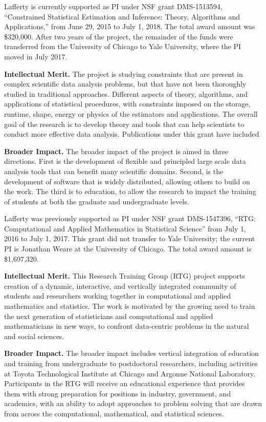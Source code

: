 \vskip10pt
\noindent
Lafferty is currently supported as PI under NSF grant DMS-1513594,
``Constrained Statistical Estimation and Inference: Theory, Algorithms
and Applications,'' from June 29, 2015 to July 1, 2018. The
total award amount was \$320,000. After two years of the project, the
remainder of the funds were transferred from the University of Chicago
to Yale University, where the PI moved in July 2017.

{\bf Intellectual Merit.}  The project is studying constraints that
are present in complex scientific data analysis problems, but that
have not been thoroughly studied in traditional approaches. Different
aspects of theory, algorithms, and applications of statistical
procedures, with constraints imposed on the storage, runtime, shape,
energy or physics of the estimators and applications. The overall goal
of the research is to develop theory and tools that can help
scientists to conduct more effective data analysis. Publications 
under this grant have included 
\citep{ChatterjeeL18,MishraILH18,
abs-1803-01302,MishraLH17,YangB0L16,ChatterjeeDLZ16,ZhengL16,MishraZLH15,ZhengL15,ZhuL14,Bonak18}


{\bf Broader Impact.}  
The broader impact of the project is aimed in three directions.
First is the development of flexible and principled
large scale data analysis tools that can benefit many
scientific domains.  Second, is the development of software
that is widely distributed, allowing others to build on the work.
The third is to education, to allow the research to impact
the training of students at both the graduate and undergraduate
levels.


\vskip10pt
\noindent
Lafferty was previously supported as PI under NSF grant DMS-1547396,
``RTG: Computational and Applied Mathematics in Statistical Science''
from July 1, 2016 to July 1, 2017. This grant did not transfer
to Yale University; the current PI is Jonathan Weare at the 
University of Chicago. The total award amount is \$1,697,320.

{\bf Intellectual Merit.}  This Research Training Group (RTG) project
supports creation of a dynamic, interactive, and vertically integrated
community of students and researchers working together in
computational and applied mathematics and statistics. The work is
motivated by the growing need to train the next generation of
statisticians and computational and applied mathematicians in new
ways, to confront data-centric problems in the natural and social
sciences.

{\bf Broader Impact.}  
The broader impact includes vertical integration 
of education and training from undergraduate to postdoctoral
researchers, including activities at 
Toyota Technological Institute at Chicago and Argonne
National Laboratory. Participants in the RTG
will receive an educational experience that provides them with strong
preparation for positions in industry, government, and academics, with
an ability to adopt approaches to problem solving that are drawn from
across the computational, mathematical, and statistical sciences.

